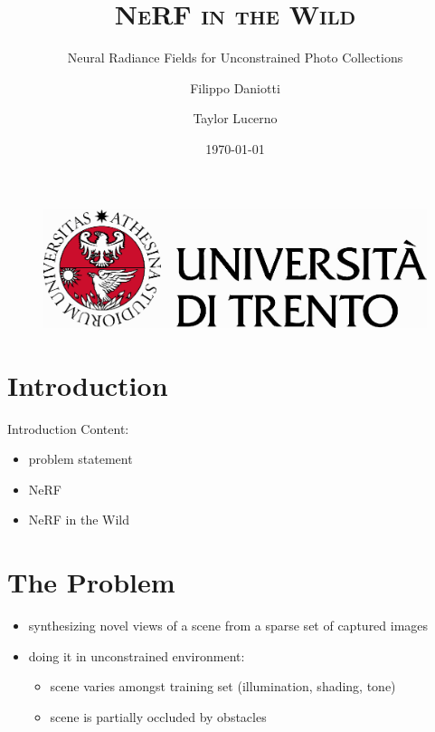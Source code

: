 \documentclass[aspectratio=1610]{beamer}
\author[Daniotti \and Lucerno]{Filippo Daniotti \and Taylor Lucerno}
\title[NeRF-W]{\textsc{NeRF in the Wild}}
\subtitle{Neural Radiance Fields for Unconstrained Photo Collections}
\institute[DISI - UniTN]{Department of Information Engineering\\and Computer Science}
\date{\today}
\begin{document}
\begin{frame}
    \titlepage
    \begin{figure}[H]
        \begin{center}
            \includegraphics[width=0.4\linewidth]{marchio_unitrento_colore_it_202002.eps}
        \end{center}
    \end{figure}
\end{frame}


\begin{frame}
    \tableofcontents[sectionstyle=show,subsectionstyle=show/shaded/hide,subsubsectionstyle=show/shaded/hide]
\end{frame}

\section{Introduction}
\begin{frame}{Introduction}
    Content:
    \begin{itemize}
        \item problem statement
        \item NeRF
        \item NeRF in the Wild
    \end{itemize}
\end{frame}

\section{The Problem}
\begin{frame}
    \begin{itemize}
        \item synthesizing novel views of a scene from a sparse set of captured images
        \item doing it in unconstrained environment:
        \begin{itemize}
            \item scene varies amongst training set (illumination, shading, tone)
            \item scene is partially occluded by obstacles
        \end{itemize}
    \end{itemize}
\end{frame}
\end{document}

